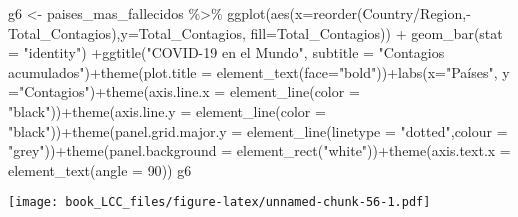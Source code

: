 \documentclass[
]{book}
\newenvironment{Shaded}{\begin{snugshade}}{\end{snugshade}}
\newcommand{\AttributeTok}[1]{\textcolor[rgb]{0.77,0.63,0.00}{#1}}
\newcommand{\DecValTok}[1]{\textcolor[rgb]{0.00,0.00,0.81}{#1}}
\newcommand{\FunctionTok}[1]{\textcolor[rgb]{0.00,0.00,0.00}{#1}}
\newcommand{\NormalTok}[1]{#1}
\newcommand{\OtherTok}[1]{\textcolor[rgb]{0.56,0.35,0.01}{#1}}
\newcommand{\SpecialCharTok}[1]{\textcolor[rgb]{0.00,0.00,0.00}{#1}}
\newcommand{\StringTok}[1]{\textcolor[rgb]{0.31,0.60,0.02}{#1}}
\begin{document}
\begin{Shaded}
\begin{Highlighting}[]
\NormalTok{g6 }\OtherTok{\textless{}{-}}\NormalTok{ paises\_mas\_fallecidos }\SpecialCharTok{\%\textgreater{}\%}
    \FunctionTok{ggplot}\NormalTok{(}\FunctionTok{aes}\NormalTok{(}\AttributeTok{x=}\FunctionTok{reorder}\NormalTok{(}\StringTok{\textasciigrave{}}\AttributeTok{Country/Region}\StringTok{\textasciigrave{}}\NormalTok{,}\SpecialCharTok{{-}}\NormalTok{Total\_Contagios),}\AttributeTok{y=}\NormalTok{Total\_Contagios, }\AttributeTok{fill=}\NormalTok{Total\_Contagios)) }\SpecialCharTok{+}  \FunctionTok{geom\_bar}\NormalTok{(}\AttributeTok{stat =} \StringTok{"identity"}\NormalTok{) }\SpecialCharTok{+}\FunctionTok{ggtitle}\NormalTok{(}\StringTok{"COVID{-}19 en el Mundo"}\NormalTok{, }\AttributeTok{subtitle =} \StringTok{"Contagios acumulados"}\NormalTok{)}\SpecialCharTok{+}\FunctionTok{theme}\NormalTok{(}\AttributeTok{plot.title =} \FunctionTok{element\_text}\NormalTok{(}\AttributeTok{face=}\StringTok{"bold"}\NormalTok{))}\SpecialCharTok{+}\FunctionTok{labs}\NormalTok{(}\AttributeTok{x=}\StringTok{"Países"}\NormalTok{, }\AttributeTok{y =}\StringTok{"Contagios"}\NormalTok{)}\SpecialCharTok{+}\FunctionTok{theme}\NormalTok{(}\AttributeTok{axis.line.x =} \FunctionTok{element\_line}\NormalTok{(}\AttributeTok{color =} \StringTok{"black"}\NormalTok{))}\SpecialCharTok{+}\FunctionTok{theme}\NormalTok{(}\AttributeTok{axis.line.y =} \FunctionTok{element\_line}\NormalTok{(}\AttributeTok{color =} \StringTok{"black"}\NormalTok{))}\SpecialCharTok{+}\FunctionTok{theme}\NormalTok{(}\AttributeTok{panel.grid.major.y =} \FunctionTok{element\_line}\NormalTok{(}\AttributeTok{linetype =} \StringTok{"dotted"}\NormalTok{,}\AttributeTok{colour =} \StringTok{"grey"}\NormalTok{))}\SpecialCharTok{+}\FunctionTok{theme}\NormalTok{(}\AttributeTok{panel.background =} \FunctionTok{element\_rect}\NormalTok{(}\StringTok{"white"}\NormalTok{))}\SpecialCharTok{+}\FunctionTok{theme}\NormalTok{(}\AttributeTok{axis.text.x =} \FunctionTok{element\_text}\NormalTok{(}\AttributeTok{angle =} \DecValTok{90}\NormalTok{))}
\NormalTok{g6}
\end{Highlighting}
\end{Shaded}

\texttt{[image: book\_LCC\_files/figure-latex/unnamed-chunk-56-1.pdf]}
\end{document}
